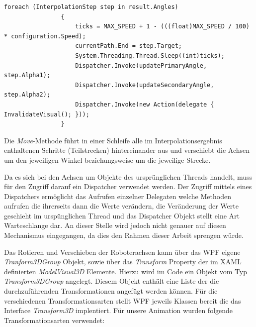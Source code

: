\begin{lstlisting}[language=CSharp, caption={Ausschnitt aus der Move-Methode der 2D-Visualisierung}, captionpos=b]
foreach (InterpolationStep step in result.Angles)
                {
                    ticks = MAX_SPEED + 1 - (((float)MAX_SPEED / 100) * configuration.Speed);       
                    currentPath.End = step.Target;
                    System.Threading.Thread.Sleep((int)ticks);
                    Dispatcher.Invoke(updatePrimaryAngle, step.Alpha1);
                    Dispatcher.Invoke(updateSecondaryAngle, step.Alpha2);
                    Dispatcher.Invoke(new Action(delegate { InvalidateVisual(); }));
                }
\end{lstlisting}

Die \textit{Move}-Methode führt in einer Schleife alle im Interpolationsergebnis enthaltenen Schritte (Teilstrecken) hintereinander aus und verschiebt die Achsen um den jeweiligen Winkel beziehungsweise um die jeweilige Strecke. 

Da es sich bei den Achsen um Objekte des ursprünglichen Threads handelt, muss für den Zugriff darauf ein Dispatcher verwendet werden. Der Zugriff mittels eines Dispatchers ermöglicht das Aufrufen einzelner Delegaten welche Methoden aufrufen die ihrerseits dann die Werte verändern, die Veränderung der Werte geschieht im urspünglichen Thread und das Dispatcher Objekt stellt eine Art Warteschlange dar. An dieser Stelle wird jedoch nicht genauer auf diesen Mechanismus eingegangen, da dies den Rahmen dieser Arbeit sprengen würde.

Das Rotieren und Verschieben der Roboterachsen kann über das WPF eigene \textit{Tranform3DGroup} Objekt, sowie über das \textit{Transform} Property der im XAML definierten \textit{ModelVisual3D} Elemente.
Hierzu wird im Code ein Objekt vom Typ \textit{ Transform3DGroup} angelegt. Diesem Objekt enthält eine Liste der die durchzuführenden Transformationen angefügt werden können. Für die verschiedenen Transformationsarten stellt WPF jeweils Klassen bereit die das Interface \textit{Transform3D} implentiert. Für unsere Animation wurden folgende Transformationsarten verwendet:

